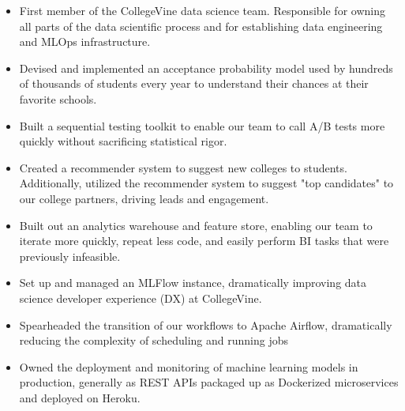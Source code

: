 \documentclass[10pt,a4paper,ragged2e,withhyper]{/Users/matt/documents/GitHub/mrkaye97.github.io/resume/altacv}
\begin{document}
	


	 \makecvheader
		
	
		\begin{itemize}
		\item First member of the CollegeVine data science team.  Responsible for owning all parts of the data scientific process and for establishing data engineering and MLOps infrastructure.
		\item Devised and implemented an acceptance probability model used by hundreds of thousands of students every year to understand their chances at their favorite schools.
		\item Built a sequential testing toolkit to enable our team to call A/B tests more quickly without sacrificing statistical rigor.
		\item Created a recommender system to suggest new colleges to students. Additionally, utilized the recommender system to suggest "top candidates" to our college partners, driving leads and engagement.
		\item Built out an analytics warehouse and feature store, enabling our team to iterate more quickly, repeat less code, and easily perform BI tasks that were previously infeasible.
		\item Set up and managed an MLFlow instance,  dramatically improving data science developer experience (DX) at CollegeVine.
		\item Spearheaded the transition of our workflows to Apache Airflow,  dramatically reducing the complexity of scheduling and running jobs
		\item Owned the deployment and monitoring of machine learning models in production, generally as REST APIs packaged up as Dockerized microservices and deployed on Heroku.
		\end{itemize}
		
		\divider
		
		
\end{document}
